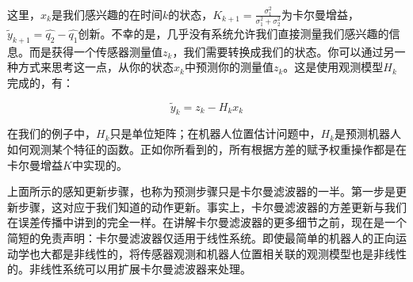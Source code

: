 这里，$\hat{x}_k$是我们感兴趣的在时间$k$的状态，$K_{k+1}=\frac{\sigma_1^2}{\sigma_1^2+\sigma_2^2}$为卡尔曼增益，$\tilde{y}_{k+1}=\hat{q_2}-\hat{q_1}$创新。不幸的是，几乎没有系统允许我们直接测量我们感兴趣的信息。而是获得一个传感器测量值$z_k$，我们需要转换成我们的状态。你可以通过另一种方式来思考这一点，从你的状态$x_k$中预测你的测量值$z_k$。这是使用观测模型$H_k$完成的，有：

\begin{equation}
\tilde{y}_{k}=z_k-H_k x_k
\end{equation}


在我们的例子中，$H_k$只是单位矩阵；在机器人位置估计问题中，$H_k$是预测机器人如何观测某个特征的函数。正如你所看到的，所有根据方差的赋予权重操作都是在卡尔曼增益$K$中实现的。


上面所示的感知更新步骤，也称为预测步骤只是卡尔曼滤波器的一半。第一步是更新步骤，这对应于我们知道的动作更新。事实上，卡尔曼滤波器的方差更新与我们在误差传播中讲到的完全一样。在讲解卡尔曼滤波器的更多细节之前，现在是一个简短的免责声明：卡尔曼滤波器仅适用于线性系统。即使最简单的机器人的正向运动学也大都是非线性的，将传感器观测和机器人位置相关联的观测模型也是非线性的。非线性系统可以用扩展卡尔曼滤波器来处理。


